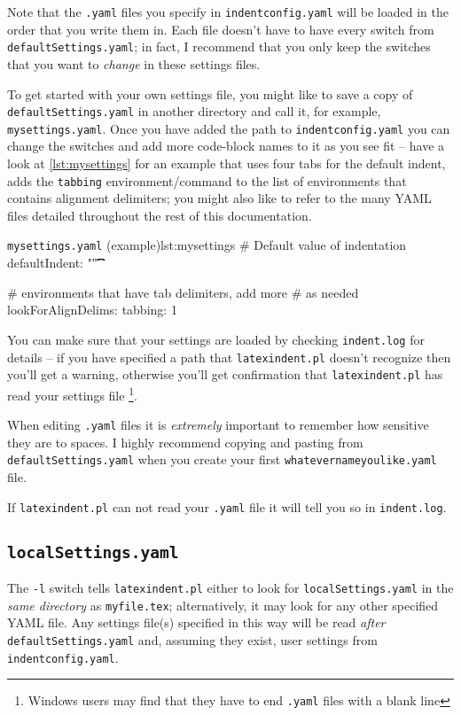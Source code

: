 	Note that the \texttt{.yaml} files you specify in \texttt{indentconfig.yaml}
	will be loaded in the order that you write them in. Each file doesn't have
	to have every switch from \texttt{defaultSettings.yaml}; in fact, I recommend
	that you only keep the switches that you want to \emph{change} in these
	settings files.

	To get started with your own settings file, you might like to save a copy of
	\texttt{defaultSettings.yaml} in another directory and call it, for
	example, \texttt{mysettings.yaml}. Once you have added the path to \texttt{indentconfig.yaml}
	you can change the switches and add more code-block names to it
	as you see fit -- have a look at \cref{lst:mysettings} for an example
	that uses four tabs for the default indent, adds the \texttt{tabbing}
	environment/command to the list of environments that contains alignment delimiters; you might also like to
	refer to the many YAML files detailed throughout the rest of this documentation.

	\begin{yaml}{\texttt{mysettings.yaml} (example)}{lst:mysettings}
	# Default value of indentation
	defaultIndent: "\t\t\t\t"

	# environments that have tab delimiters, add more
	# as needed
	lookForAlignDelims:
	tabbing: 1
\end{yaml}

	You can make sure that your settings are loaded by checking \texttt{indent.log}
	for details -- if you have specified a path that \texttt{latexindent.pl} doesn't
	recognize then you'll get a warning, otherwise you'll get confirmation that
	\texttt{latexindent.pl} has read your settings file \footnote{Windows users
		may find that they have to end \texttt{.yaml} files with a blank line}.

	\begin{warning}
		When editing \texttt{.yaml} files it is \emph{extremely} important
		to remember how sensitive they are to spaces. I highly recommend copying
		and pasting from \texttt{defaultSettings.yaml} when you create your
		first \texttt{whatevernameyoulike.yaml} file.

		If \texttt{latexindent.pl} can not read your \texttt{.yaml} file it
		will tell you so in \texttt{indent.log}.
	\end{warning}

\subsection{\texttt{localSettings.yaml}}\label{sec:localsettings}
	The \texttt{-l} switch tells \texttt{latexindent.pl} either to look for \texttt{localSettings.yaml} in the
	\emph{same directory} as \texttt{myfile.tex}; alternatively, it may look for any
	other specified YAML file. Any settings file(s) specified in this way will
	be read \emph{after} \texttt{defaultSettings.yaml} and, assuming they exist,
	user settings from \texttt{indentconfig.yaml}.

